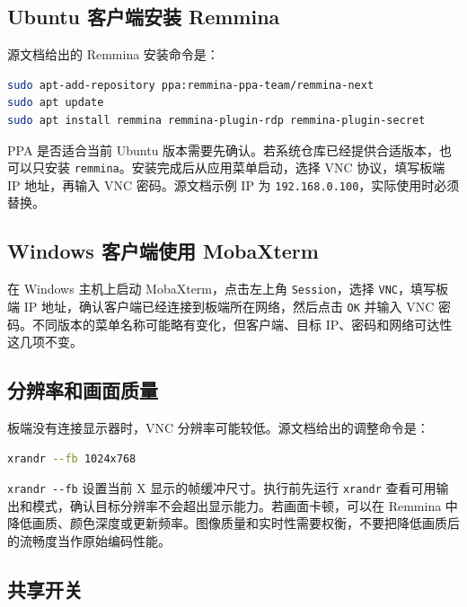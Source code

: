 \subsection{Ubuntu 客户端安装
Remmina}\label{ubuntu-ux5ba2ux6237ux7aefux5b89ux88c5-remmina}

源文档给出的 Remmina 安装命令是：

\begin{lstlisting}[language=bash]
sudo apt-add-repository ppa:remmina-ppa-team/remmina-next
sudo apt update
sudo apt install remmina remmina-plugin-rdp remmina-plugin-secret
\end{lstlisting}

PPA 是否适合当前 Ubuntu
版本需要先确认。若系统仓库已经提供合适版本，也可以只安装
\passthrough{\lstinline!remmina!}。安装完成后从应用菜单启动，选择 VNC
协议，填写板端 IP 地址，再输入 VNC 密码。源文档示例 IP 为
\passthrough{\lstinline!192.168.0.100!}，实际使用时必须替换。

\subsection{Windows 客户端使用
MobaXterm}\label{windows-ux5ba2ux6237ux7aefux4f7fux7528-mobaxterm}

在 Windows 主机上启动 MobaXterm，点击左上角
\passthrough{\lstinline!Session!}，选择
\passthrough{\lstinline!VNC!}，填写板端 IP
地址，确认客户端已经连接到板端所在网络，然后点击
\passthrough{\lstinline!OK!} 并输入 VNC
密码。不同版本的菜单名称可能略有变化，但客户端、目标
IP、密码和网络可达性这几项不变。

\subsection{分辨率和画面质量}\label{ux5206ux8fa8ux7387ux548cux753bux9762ux8d28ux91cf}

板端没有连接显示器时，VNC 分辨率可能较低。源文档给出的调整命令是：

\begin{lstlisting}[language=bash]
xrandr --fb 1024x768
\end{lstlisting}

\passthrough{\lstinline!xrandr --fb!} 设置当前 X
显示的帧缓冲尺寸。执行前先运行 \passthrough{\lstinline!xrandr!}
查看可用输出和模式，确认目标分辨率不会超出显示能力。若画面卡顿，可以在
Remmina
中降低画质、颜色深度或更新频率。图像质量和实时性需要权衡，不要把降低画质后的流畅度当作原始编码性能。

\subsection{共享开关}\label{ux5171ux4eabux5f00ux5173}

